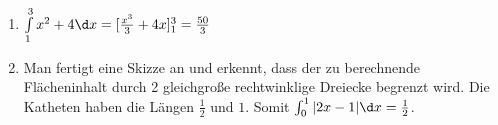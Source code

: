 \item

\begin{enumerate}
\item $\int\limits_1^3 x^2+ 4 \d x = \lbrack \frac{x^3}{3}+4x\rbrack_1^3 = \frac{50}{3}$
\item Man fertigt eine Skizze an und erkennt, dass der zu berechnende Flächeninhalt durch 2 gleichgroße rechtwinklige Dreiecke begrenzt wird. Die Katheten haben die Längen $\frac{1}{2}$ und $1$. Somit $\int_0^1 |2x-1|\d x = \frac{1}{2}$.
\end{enumerate}

